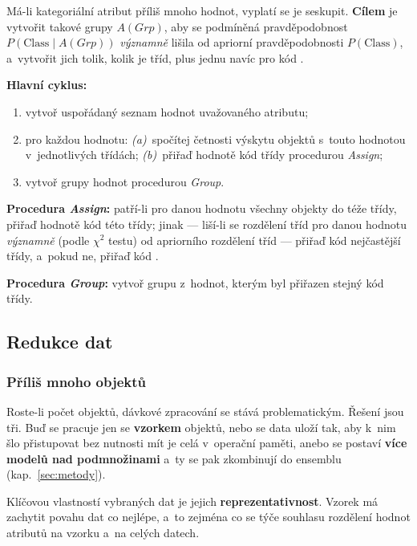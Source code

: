 \documentclass[11pt,a4paper]{article}
\theoremstyle{definition}
\begin{document}
Má-li kategoriální atribut příliš mnoho hodnot, vyplatí se je seskupit. \textbf{Cílem} je
vytvořit takové grupy $A(\mathit{Grp})$, aby se podmíněná pravděpodobnost
$P(\mathrm{Class}\mid A(\mathit{Grp}))$ \emph{významně} lišila od apriorní pravděpodobnosti
$P(\mathrm{Class})$, a~vytvořit jich tolik, kolik je tříd, plus jednu navíc pro kód .

\begin{defbox}
\textbf{Hlavní cyklus:}
\begin{enumerate}
\item vytvoř uspořádaný seznam hodnot uvažovaného atributu;
\item pro každou hodnotu: \emph{(a)}~spočítej četnosti výskytu objektů s~touto hodnotou
      v~jednotlivých třídách; \emph{(b)}~přiřaď hodnotě kód třídy procedurou
      \emph{Assign};
\item vytvoř grupy hodnot procedurou \emph{Group}.
\end{enumerate}

\textbf{Procedura \emph{Assign}:} patří-li pro danou hodnotu všechny objekty do téže třídy,
přiřaď hodnotě kód této třídy; jinak --- liší-li se rozdělení tříd pro danou hodnotu
\emph{významně} (podle $\chi^2$ testu) od apriorního rozdělení tříd --- přiřaď kód
nejčastější třídy, a~pokud ne, přiřaď kód .

\textbf{Procedura \emph{Group}:} vytvoř grupu z~hodnot, kterým byl přiřazen stejný kód
třídy.
\end{defbox}

\subsection{Redukce dat}

\subsubsection{Příliš mnoho objektů}

Roste-li počet objektů, dávkové zpracování se stává problematickým. Řešení jsou tři. Buď se
pracuje jen se \textbf{vzorkem} objektů, nebo se data uloží tak, aby k~nim šlo přistupovat bez
nutnosti mít je celá v~operační paměti, anebo se postaví \textbf{více modelů nad podmnožinami}
a~ty se pak zkombinují do ensemblu (kap.~\ref{sec:metody}).

Klíčovou vlastností vybraných dat je jejich \textbf{reprezentativnost}. Vzorek má zachytit
povahu dat co nejlépe, a~to zejména co se týče souhlasu rozdělení hodnot atributů na vzorku
a~na celých datech.
\end{document}
